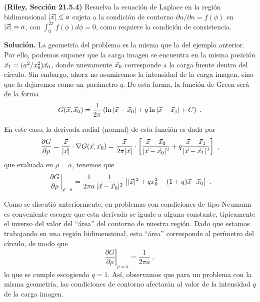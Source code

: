\begin{ejemplo}
    \textbf{(Riley, Sección 21.5.4)} Resuelva la ecuación de Laplace en la región bidimensional $|\vec{x}| \leq a$ sujeta a la condición de contorno $\partial u/\partial n = f(\phi)$ en $|\vec{x}| = a$, con $\int_0^{2\pi} f(\phi) d\phi = 0$, como requiere la condición de consistencia.

    \textbf{Solución.} La geometría del problema es la misma que la del ejemplo anterior. Por ello, podemos suponer que la carga imagen se encuentra en la misma posición $\vec{x}_1 = (a^2/x_0^2) \vec{x}_0$, donde nuevamente $\vec{x}_0$ corresponde a la carga fuente dentro del círculo. Sin embargo, ahora no asumiremos la intensidad de la carga imagen, sino que la dejaremos como un parámetro $q$. De esta forma, la función de Green será de la forma
    \begin{equation*}
        G(\vec{x}, \vec{x}_0) = \frac{1}{2\pi} \left( \ln |\vec{x} - \vec{x}_0| + q \ln |\vec{x} - \vec{x}_1| + C \right) \ .
    \end{equation*}

    En este caso, la derivada radial (normal) de esta función es dada por
    \begin{equation*}
        \frac{\partial G}{\partial \rho} = \frac{\vec{x}}{|\vec{x}|} \cdot \nabla G(\vec{x}, \vec{x}_0) = \frac{\vec{x}}{2\pi |\vec{x}|} \cdot \left[ \frac{\vec{x} - \vec{x}_0}{|\vec{x} - \vec{x}_0|^2} + q \frac{\vec{x} - \vec{x}_1}{|\vec{x} - \vec{x}_1|^2} \right] \ ,
    \end{equation*}
    que evaluada en $\rho = a$, tenemos que
    \begin{equation*}
        \left. \frac{\partial G}{\partial \rho} \right|_{\rho = a} = \frac{1}{2\pi a} \frac{1}{|\x - \x_0|^2} \left[ |\x|^2 + qx_0^2 - (1+q) \x \cdot \x_0 \right] \ .
    \end{equation*} 

    Como se discutió anteriormente, en problemas con condiciones de tipo Neumann es conveniente escoger que esta derivada se iguale a alguna constante, típicamente el inverso del valor del ``área'' del contorno de nuestra región. Dado que estamos trabajando en una región bidimensional, esta ``área'' corresponde al perímetro del círculo, de modo que
    \begin{equation*}
        \left. \frac{\partial G}{\partial \rho} \right|_{\rho = a} = \frac{1}{2\pi a} \ ,
    \end{equation*}
    lo que se cumple escogiendo $q = 1$. Así, observamos que para un problema con la misma geometría, las condiciones de contorno afectarán al valor de la intensidad $q$ de la carga imagen.


\end{ejemplo}
